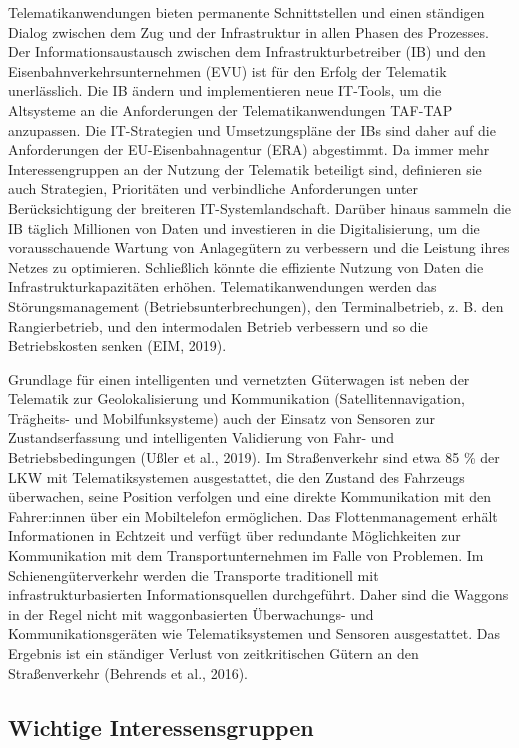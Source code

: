 \documentclass[
]{book}
\begin{document}
Telematikanwendungen bieten permanente Schnittstellen und einen ständigen Dialog zwischen dem Zug und der Infrastruktur in allen Phasen des Prozesses. Der Informationsaustausch zwischen dem Infrastrukturbetreiber (IB) und den Eisenbahnverkehrsunternehmen (EVU) ist für den Erfolg der Telematik unerlässlich. Die IB ändern und implementieren neue IT-Tools, um die Altsysteme an die Anforderungen der Telematikanwendungen TAF-TAP anzupassen. Die IT-Strategien und Umsetzungspläne der IBs sind daher auf die Anforderungen der EU-Eisenbahnagentur (ERA) abgestimmt. Da immer mehr Interessengruppen an der Nutzung der Telematik beteiligt sind, definieren sie auch Strategien, Prioritäten und verbindliche Anforderungen unter Berücksichtigung der breiteren IT-Systemlandschaft. Darüber hinaus sammeln die IB täglich Millionen von Daten und investieren in die Digitalisierung, um die vorausschauende Wartung von Anlagegütern zu verbessern und die Leistung ihres Netzes zu optimieren. Schließlich könnte die effiziente Nutzung von Daten die Infrastrukturkapazitäten erhöhen. Telematikanwendungen werden das Störungsmanagement (Betriebsunterbrechungen), den Terminalbetrieb, z. B. den Rangierbetrieb, und den intermodalen Betrieb verbessern und so die Betriebskosten senken (EIM, 2019).

Grundlage für einen intelligenten und vernetzten Güterwagen ist neben der Telematik zur Geolokalisierung und Kommunikation (Satellitennavigation, Trägheits- und Mobilfunksysteme) auch der Einsatz von Sensoren zur Zustandserfassung und intelligenten Validierung von Fahr- und Betriebsbedingungen (Ußler et al., 2019). Im Straßenverkehr sind etwa 85 \% der LKW mit Telematiksystemen ausgestattet, die den Zustand des Fahrzeugs überwachen, seine Position verfolgen und eine direkte Kommunikation mit den Fahrer:innen über ein Mobiltelefon ermöglichen. Das Flottenmanagement erhält Informationen in Echtzeit und verfügt über redundante Möglichkeiten zur Kommunikation mit dem Transportunternehmen im Falle von Problemen. Im Schienengüterverkehr werden die Transporte traditionell mit infrastrukturbasierten Informationsquellen durchgeführt. Daher sind die Waggons in der Regel nicht mit waggonbasierten Überwachungs- und Kommunikationsgeräten wie Telematiksystemen und Sensoren ausgestattet. Das Ergebnis ist ein ständiger Verlust von zeitkritischen Gütern an den Straßenverkehr (Behrends et al., 2016).

\hypertarget{wichtige-interessensgruppen-29}{%
\subsection*{Wichtige Interessensgruppen}\label{wichtige-interessensgruppen-29}}
\end{document}
